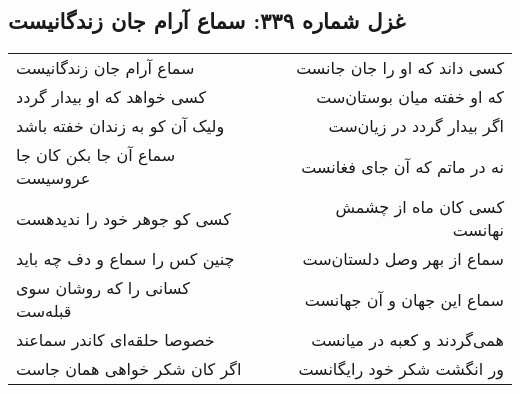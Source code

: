 \begin{center}
\section*{غزل شماره ۳۳۹: سماع آرام جان زندگانیست}
\label{sec:0339}
\begin{longtable}{l p{0.5cm} r}
سماع آرام جان زندگانیست
&&
کسی داند که او را جان جانست
\\
کسی خواهد که او بیدار گردد
&&
که او خفته میان بوستان‌ست
\\
ولیک آن کو به زندان خفته باشد
&&
اگر بیدار گردد در زیان‌ست
\\
سماع آن جا بکن کان جا عروسیست
&&
نه در ماتم که آن جای فغانست
\\
کسی کو جوهر خود را ندیدهست
&&
کسی کان ماه از چشمش نهانست
\\
چنین کس را سماع و دف چه باید
&&
سماع از بهر وصل دلستان‌ست
\\
کسانی را که روشان سوی قبله‌ست
&&
سماع این جهان و آن جهانست
\\
خصوصا حلقه‌ای کاندر سماعند
&&
همی‌گردند و کعبه در میانست
\\
اگر کان شکر خواهی همان جاست
&&
ور انگشت شکر خود رایگانست
\\
\end{longtable}
\end{center}
